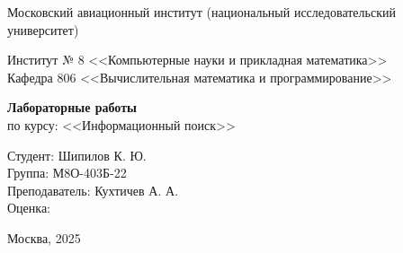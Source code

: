 \begin{titlepage}
    \newpage
    
    \begin{center}
        Московский авиационный институт (национальный исследовательский университет)
        
        \vspace{4cm}

        Институт № 8 <<Компьютерные науки и прикладная математика>> \\
        Кафедра 806 <<Вычислительная математика и программирование>>

        \vspace{4cm}

        \textbf{Лабораторные работы} \\
        по курсу: <<Информационный поиск>>
    \end{center}

    \vspace{4cm}

    \begin{flushright}
        Студент: Шипилов К. Ю. \\
        Группа: М8О-403Б-22 \\
        Преподаватель: Кухтичев А. А. \\
        Оценка: \underline{\hspace{3cm}}
    \end{flushright}

    \vspace{\fill}

    \begin{center}
        Москва, 2025
    \end{center}

\end{titlepage}
